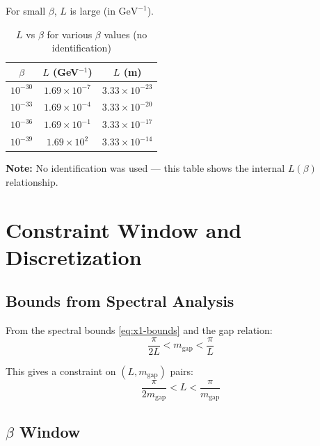\documentclass[11pt,a4paper]{article}
\begin{document}
For small $\beta$, $L$ is large (in $\text{GeV}^{-1}$).

\begin{table}[h]
\centering
\caption{$L$ vs $\beta$ for various $\beta$ values (no identification)}
\label{tab:L-vs-beta}
\begin{tabular}{ccc}
\toprule
$\beta$ & $L$ (GeV$^{-1}$) & $L$ (m) \\
\midrule
$10^{-30}$ & $1.69 \times 10^{-7}$ & $3.33 \times 10^{-23}$ \\
$10^{-33}$ & $1.69 \times 10^{-4}$ & $3.33 \times 10^{-20}$ \\
$10^{-36}$ & $1.69 \times 10^{-1}$ & $3.33 \times 10^{-17}$ \\
$10^{-39}$ & $1.69 \times 10^{2}$ & $3.33 \times 10^{-14}$ \\
\bottomrule
\end{tabular}
\end{table}

\textbf{Note:} No identification was used — this table shows the internal
$L(\beta)$ relationship.

\section{Constraint Window and Discretization}
\label{sec:constraint}

\subsection{Bounds from Spectral Analysis}

From the spectral bounds \eqref{eq:x1-bounds} and the gap relation:
\begin{equation}
  \frac{\pi}{2L} < m_{\text{gap}} < \frac{\pi}{L}
  \label{eq:gap-L-bounds}
\end{equation}

This gives a constraint on $(L, m_{\text{gap}})$ pairs:
\begin{equation}
  \frac{\pi}{2 m_{\text{gap}}} < L < \frac{\pi}{m_{\text{gap}}}
  \label{eq:L-gap-constraint}
\end{equation}

\subsection{$\beta$ Window}
\end{document}
